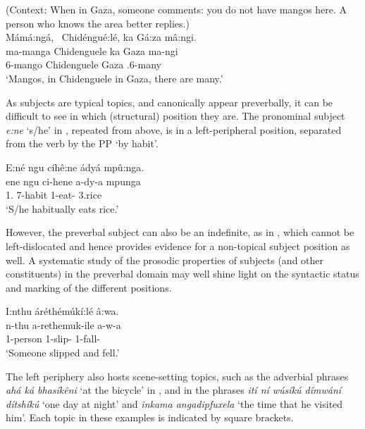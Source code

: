 \documentclass[output=paper]{langscibook}
\begin{document}
\z

\ea
\label{bkm:Ref146270227}
(Context: When in Gaza, someone comments: you do not have mangos here. A person who knows the area better replies.)\\
Mámá:ngá, ~Chidéngué:lé, ka Gá:za mâ:ngi.\\
\gll
ma-manga  Chidenguele  ka  Gaza  ma-ngi\\
6-mango  Chidenguele  \LOC{}  Gaza  \COP{}.6{}-many\\
\glt
‘Mangos, in Chidenguele in Gaza, there are many.’\\

\z

As subjects are typical topics, and canonically appear preverbally, it can be difficult to see in which (structural) position they are. The pronominal subject \textit{e:ne} ‘s/he’ in , repeated from  above, is in a left-peripheral position, separated from the verb by the PP ‘by habit’.

\ea
\label{bkm:Ref141350066}
E:né ngu cíhê:ne ádyá mpû:nga.\\
\gll
ene  ngu  ci-hene  a-dy-a  mpunga\\
1.\PRO{}  \PREP{}  7-habit  1\SM{}-eat-\FV{}  3.rice\\
\glt
‘S/he habitually eats rice.’\\

\z

However, the preverbal subject can also be an indefinite, as in , which cannot be left-dislocated and hence provides evidence for a non-topical subject position as well. A systematic study of the prosodic properties of subjects (and other constituents) in the preverbal domain may well shine light on the syntactic status and marking of the different positions.

\ea
\label{bkm:Ref141350076}
I:nthu áréthémúkí:lé â:wa.\\
\gll
n-thu  a-rethemuk-ile  a-w-a\\
1-person  1\SM{}-slip-\PFV{}  1\SM{}-fall-\FV{}\\
\glt
‘Someone slipped and fell.’\\

\z

The left periphery also hosts scene-setting topics, such as the adverbial phrases \textit{ahá ká bhasíkêni} ‘at the bicycle’ in , and in  the phrases \textit{ití ní wúsíkú dímwání dítshíkú} ‘one day at night’ and \textit{inkama angadipfuxela} ‘the time that he visited him’. Each topic in these examples is indicated by square brackets.
\end{document}
